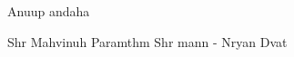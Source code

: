 \documentclass[20pt]{article}
\begin{document}
\SlokaHuge
{Anu{\sh}{\T}up {\ch}andaha}

\SlokaHuge
{Shr{\ee} Mah{\A}vi{\sh}nuh}
{Param{\A}thm{\A} Shr{\ee} mann -}
{N{\A}r{\A}yan{\oh} D{\e}vat{\ha}}







\end{document}

